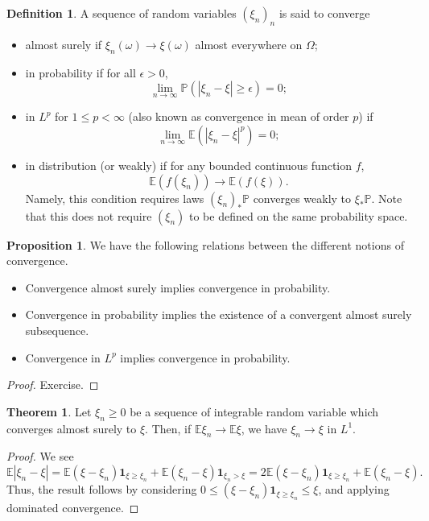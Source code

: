 \documentclass[]{article}
\theoremstyle{definition}
\newtheorem{theorem}{Theorem}
\theoremstyle{definition}
\newtheorem{definition}{Definition}[section]
\newtheorem{proposition}{Proposition}[section]
\begin{document}
\begin{definition}
  A sequence of random variables \((\xi_n)_n\) is said to converge 
  \begin{itemize}
    \item almost surely if \(\xi_n(\omega) \to \xi(\omega)\) almost everywhere 
    on \(\Omega\);
    \item in probability if for all \(\epsilon > 0\),
    \[\lim_{n \to \infty} \mathbb{P}(|\xi_n - \xi| \ge \epsilon) = 0;\]
    \item in \(L^p\) for \(1 \le p < \infty\) (also known as convergence in mean 
    of order \(p\)) if 
    \[\lim_{n \to \infty} \mathbb{E}(|\xi_n - \xi|^p) = 0;\]
    \item in distribution (or weakly) if for any bounded continuous function \(f\),
    \[\mathbb{E}(f(\xi_n)) \to \mathbb{E}(f(\xi)).\]
    Namely, this condition requires laws \((\xi_n)_* \mathbb{P}\) converges weakly 
    to \(\xi_*\mathbb{P}\). Note that this does not require \((\xi_n)\) to be 
    defined on the same probability space.
  \end{itemize}
\end{definition}

\begin{proposition}
  We have the following relations between the different notions of convergence.
  \begin{itemize}
    \item Convergence almost surely implies convergence in probability.
    \item Convergence in probability implies the existence of a convergent almost 
      surely subsequence.
    \item Convergence in \(L^p\) implies convergence in probability.
  \end{itemize}
\end{proposition}
\begin{proof}
  Exercise.
\end{proof}

\begin{theorem}
  Let \(\xi_n \ge 0\) be a sequence of integrable random variable which converges 
  almost surely to \(\xi\). Then, if \(\mathbb{E}\xi_n \to \mathbb{E}\xi\), 
  we have \(\xi_n \to \xi\) in \(L^1\).
\end{theorem}
\begin{proof}
  We see 
  \[\mathbb{E}|\xi_n - \xi| = \mathbb{E}(\xi - \xi_n)\mathbf{1}_{\xi \ge \xi_n} 
    + \mathbb{E}(\xi_n - \xi)\mathbf{1}_{\xi_n > \xi} = 
    2\mathbb{E}(\xi - \xi_n) \mathbf{1}_{\xi \ge \xi_n} + \mathbb{E}(\xi_n - \xi).\]
  Thus, the result follows by considering \(0 \le (\xi - \xi_n)\mathbf{1}_{\xi \ge \xi_n} \le \xi\), 
  and applying dominated convergence. 
\end{proof}
\end{document}
